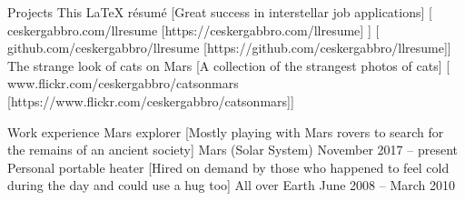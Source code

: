 \documentclass[
]{llresume}
\begin{document}
\begin{mainpane}
    \begin{mainsection}
        {Projects} %
            \entryGeneric
            {This LaTeX résumé} %
            [Great success in interstellar job applications] %
                [
                    \infoGeneric
                    {\faGlobe}%
                    {ceskergabbro.com/llresume}%
                    [https://ceskergabbro.com/llresume] %
                ]
                [\infoGithub
                    {github.com/ceskergabbro/llresume}
                    [https://github.com/ceskergabbro/llresume]]
            \entryGeneric
            {The strange look of cats on Mars}
            [A collection of the strangest photos of cats]
            [\infoFlickr
                {www.flickr.com/ceskergabbro/catsonmars}
                [https://www.flickr.com/ceskergabbro/catsonmars]]
    \end{mainsection}

    \begin{mainsection}
        {Work experience} %
                \entryJob
                {Mars explorer} %
                [Mostly playing with Mars rovers to search for the remains of an ancient society] %
                {Mars (Solar System)} %
                {November 2017 -- present} %
            \entryJob
            {Personal portable heater}
            [Hired on demand by those who happened to feel cold during the
                day and could use a hug too]
            {All over Earth}
            {June 2008 -- March 2010}
    \end{mainsection}


\end{mainpane}
\end{document}
